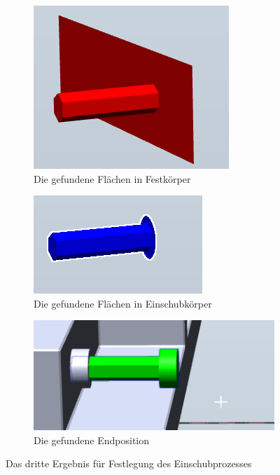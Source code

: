 \documentclass[14pt,a4paper,titlepage]{article}
\begin{document}
			\begin{figure}[t!]
			\centering
			\begin{subfigure}{0.3\linewidth}
				\includegraphics[width=\linewidth]{basefaces2.png}
				\caption{Die gefundene Flächen in Festkörper}
			\end{subfigure}
			\begin{subfigure}{0.3\linewidth}
				\includegraphics[width=\linewidth]{insertfaces2.png}
				\caption{Die gefundene Flächen in Einschubkörper}
			\end{subfigure}	
			\begin{subfigure}{0.3\linewidth}
				\includegraphics[width=\linewidth]{result2.png}
				\caption{Die gefundene Endposition}
			\end{subfigure}
			\caption{Das dritte Ergebnis für Festlegung des Einschubprozesses}
		\end{figure}
\end{document}

